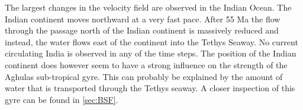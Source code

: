 The largest changes in the velocity field are observed in the Indian Ocean. The Indian continent moves northward at a very fast pace. After 55 Ma the flow through the passage north of the Indian continent is massively reduced and instead, the water flows east of the continent into the Tethys Seaway. No current circulating India is observed in any of the time steps. The position of the Indian continent does however seem to have a strong influence on the strength of the Aghulas sub-tropical gyre. This can probably be explained by the amount of water that is transported through the Tethys seaway. A closer inspection of this gyre can be found in \cref{sec:BSF}.


